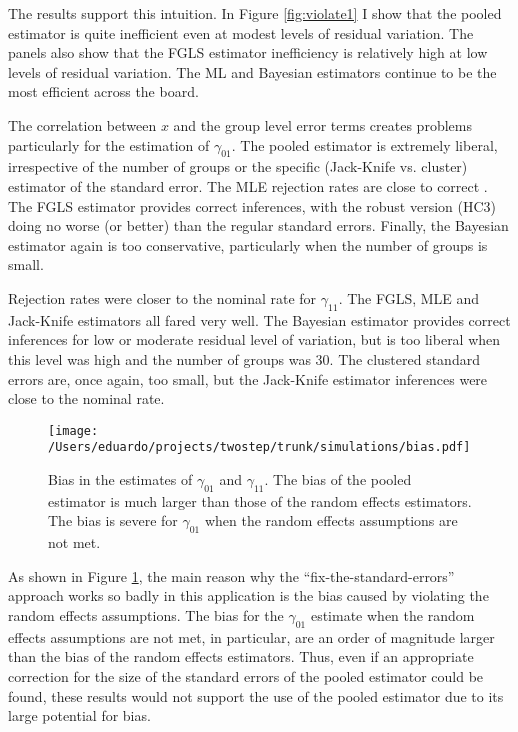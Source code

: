 The  results support this intuition. In Figure \ref{fig:violate1} I show that the pooled estimator is quite inefficient even at modest levels of residual variation.  The panels also show that the  FGLS estimator  inefficiency is relatively  high at low levels of residual variation. The ML and Bayesian estimators continue to be the most efficient across the board.

The correlation between $x$ and the group level error terms creates problems particularly for the estimation of $\gamma_{01}$.  The pooled estimator is extremely liberal, irrespective of the number of groups or the specific (Jack-Knife vs.  cluster) estimator of the standard error. The MLE rejection rates are close to correct .  The FGLS estimator  provides correct inferences, with the robust version (HC3) doing no worse (or better) than the regular standard errors.  Finally, the Bayesian estimator again is too conservative, particularly when the number of groups is small.

Rejection rates were closer to the nominal rate for $\gamma_{11}$. The FGLS, MLE and Jack-Knife estimators all fared very well. The Bayesian estimator provides  correct inferences for low or moderate residual level of variation, but is too liberal when this level was high and the number of groups was 30. The  clustered standard errors are, once again, too small, but the Jack-Knife estimator inferences were close to the nominal rate.


\begin{figure}
  \centering
  \texttt{[image: /Users/eduardo/projects/twostep/trunk/simulations/bias.pdf]}
  \caption{Bias in the estimates of $\gamma_{01}$ and $\gamma_{11}$. The bias of the pooled estimator is much larger than those of  the random effects estimators. The bias is severe for $\gamma_{01}$ when the random effects assumptions are not met.}
  \label{fig:bias}
\end{figure}


As shown in Figure \ref{fig:bias}, the main reason why the ``fix-the-standard-errors'' approach works so badly in this application is the bias caused by violating the random effects assumptions. The bias for the $\gamma_{01}$ estimate when the random effects assumptions are not met, in particular, are an order of magnitude larger than the bias of the random effects estimators. Thus, even if an appropriate correction for the size of the standard errors of the pooled estimator could be found, these results would not support the use of the pooled estimator due to its large potential for bias.

